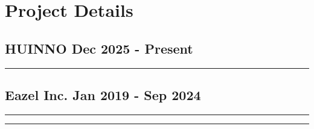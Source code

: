 \section{Project Details}
\subsection*{HUINNO \hfill Dec 2025 - Present}

\noindent\rule{16cm}{0.4pt}
\subsection*{Eazel Inc. \hfill Jan 2019 - Sep 2024}

\noindent\rule{8cm}{0.4pt}

\noindent\rule{8cm}{0.4pt}

